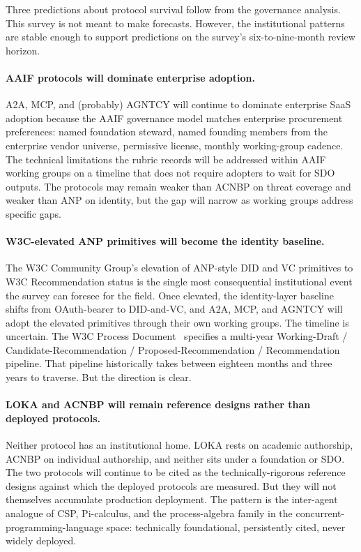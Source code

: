 Three predictions about protocol survival follow from the
governance analysis. This survey is not meant to make
forecasts. However, the institutional patterns are stable
enough to support predictions on the survey's
six-to-nine-month review horizon.

\paragraph{AAIF protocols will dominate enterprise
adoption.}
A2A, MCP, and (probably) AGNTCY will continue to
dominate enterprise SaaS adoption because the AAIF
governance model matches enterprise procurement
preferences: named foundation steward, named founding
members from the enterprise vendor universe, permissive
license, monthly working-group cadence. The technical
limitations the rubric records will be addressed within
AAIF working groups on a timeline that does not require
adopters to wait for SDO outputs. The protocols may
remain weaker than ACNBP on threat coverage and weaker
than ANP on identity, but the gap will narrow as
working groups address specific gaps.

\paragraph{W3C-elevated ANP primitives will become
the identity baseline.}
The W3C Community Group's elevation of ANP-style DID
and VC primitives to W3C Recommendation status is the
single most consequential institutional event the
survey can foresee for the field. Once elevated, the
identity-layer baseline shifts from OAuth-bearer to
DID-and-VC, and A2A, MCP, and AGNTCY will adopt the
elevated primitives through their own working groups.
The timeline is uncertain. The W3C Process
Document~\cite{w3c_process_doc} specifies a multi-year
Working-Draft / Candidate-Recommendation /
Proposed-Recommendation / Recommendation pipeline. That
pipeline historically takes between eighteen months and
three years to traverse. But the direction is clear.

\paragraph{LOKA and ACNBP will remain reference
designs rather than deployed protocols.}
Neither protocol has an institutional home. LOKA rests on
academic authorship, ACNBP on individual authorship, and
neither sits under a foundation or SDO. The two protocols
will continue to be cited as the technically-rigorous
reference designs against which the deployed protocols
are measured. But they will not themselves accumulate
production deployment. The pattern is the
inter-agent analogue of CSP, Pi-calculus, and the
process-algebra family in the
concurrent-programming-language space: technically
foundational, persistently cited, never widely
deployed.

